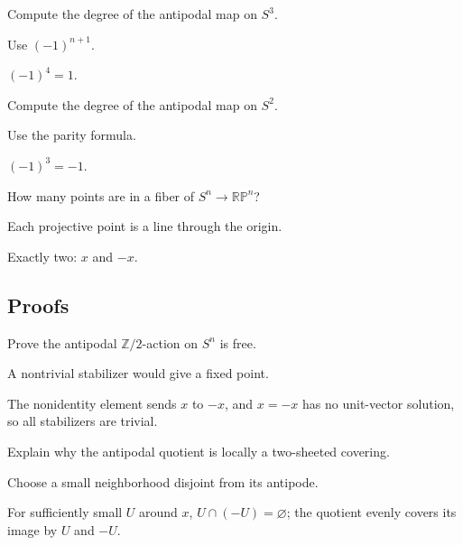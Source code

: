 \begin{exercise}[Degree on $S^3$]\label{exr:viii04-ped-03}
Compute the degree of the antipodal map on $S^3$.
\end{exercise}
\begin{hint}
Use $(-1)^{n+1}$.
\end{hint}
\begin{solution}
$(-1)^4=1$.
\end{solution}

\begin{exercise}[Degree on $S^2$]\label{exr:viii04-ped-04}
Compute the degree of the antipodal map on $S^2$.
\end{exercise}
\begin{hint}
Use the parity formula.
\end{hint}
\begin{solution}
$(-1)^3=-1$.
\end{solution}

\begin{exercise}\label{exr:viii04-ped-05}
How many points are in a fiber of $S^n\to\mathbb{RP}^n$?
\end{exercise}
\begin{hint}
Each projective point is a line through the origin.
\end{hint}
\begin{solution}
Exactly two: $x$ and $-x$.
\end{solution}

\subsection*{Proofs}

\begin{exercise}\label{exr:viii04-ped-06}
Prove the antipodal $\mathbb Z/2$-action on $S^n$ is free.
\end{exercise}
\begin{hint}
A nontrivial stabilizer would give a fixed point.
\end{hint}
\begin{solution}
The nonidentity element sends $x$ to $-x$, and $x=-x$ has no unit-vector solution, so all stabilizers are trivial.
\end{solution}

\begin{exercise}\label{exr:viii04-ped-07}
Explain why the antipodal quotient is locally a two-sheeted covering.
\end{exercise}
\begin{hint}
Choose a small neighborhood disjoint from its antipode.
\end{hint}
\begin{solution}
For sufficiently small $U$ around $x$, $U\cap(-U)=\varnothing$; the quotient evenly covers its image by $U$ and $-U$.
\end{solution}

